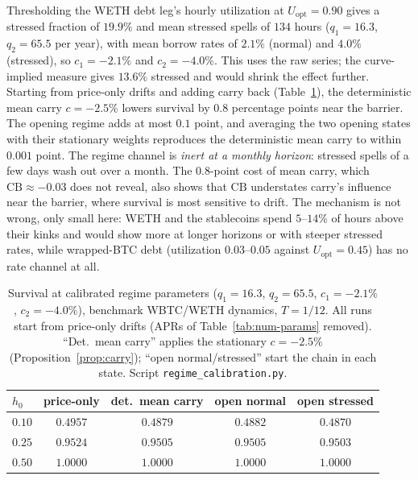 \documentclass[11pt]{article}
\theoremstyle{plain}
\theoremstyle{definition}
\theoremstyle{remark}
\begin{document}
Thresholding the WETH debt leg's hourly utilization at $U_{\mathrm{opt}}=0.90$ gives a stressed
fraction of $19.9\%$ and mean stressed spells of $134$ hours ($q_1=16.3$, $q_2=65.5$ per year), with
mean borrow rates of $2.1\%$ (normal) and $4.0\%$ (stressed), so $c_1=-2.1\%$ and $c_2=-4.0\%$.
This uses the raw series; the curve-implied measure gives $13.6\%$ stressed and would shrink the
effect further. Starting from price-only drifts and adding carry back (Table~\ref{tab:regime}), the
deterministic mean carry $c=-2.5\%$ lowers survival by $0.8$ percentage points near the barrier. The
opening regime adds at most $0.1$ point, and averaging the two opening states with their stationary
weights reproduces the deterministic mean carry to within $0.001$ point. The regime channel
is \emph{inert at a monthly horizon}: stressed spells of a few days wash out over a month. The
$0.8$-point cost of mean carry, which $\mathrm{CB}\approx-0.03$ does not reveal, also shows that
$\mathrm{CB}$ understates carry's influence near the barrier, where survival is most sensitive to
drift. The mechanism is not wrong, only small here: WETH and the stablecoins spend $5$--$14\%$ of
hours above their kinks and would show more at longer horizons or with steeper stressed rates, while
wrapped-BTC debt (utilization $0.03$--$0.05$ against $U_{\mathrm{opt}}=0.45$) has no rate channel at
all.

\begin{table}[ht]
\centering
\small
\begin{tabular}{lcccc}
\toprule
$h_0$ & price-only & det.\ mean carry & open normal & open stressed \\
\midrule
$0.10$ & $0.4957$ & $0.4879$ & $0.4882$ & $0.4870$ \\
$0.25$ & $0.9524$ & $0.9505$ & $0.9505$ & $0.9503$ \\
$0.50$ & $1.0000$ & $1.0000$ & $1.0000$ & $1.0000$ \\
\bottomrule
\end{tabular}
\caption{Survival at calibrated regime parameters ($q_1=16.3$, $q_2=65.5$, $c_1=-2.1\%$,
$c_2=-4.0\%$), benchmark WBTC/WETH dynamics, $T=1/12$. All runs start from price-only drifts (APRs of
Table~\ref{tab:num-params} removed). ``Det.\ mean carry'' applies the stationary $c=-2.5\%$
(Proposition~\ref{prop:carry}); ``open normal/stressed'' start the chain in each state. Script
\texttt{regime\_calibration.py}.}
\label{tab:regime}
\end{table}
\end{document}
